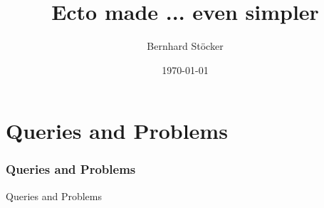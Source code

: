 \documentclass{beamer}
\title[Ecto made even simpler]{Ecto made \cancel{simple}... even simpler} %
\author{Bernhard St\"ocker} %
\institute[UCLA] %
{
Recogizer Group GmbH\\
Predictive Analytics\\ %
\medskip
\textit{bernhard.stoecker@recogizer.de} %
}
\date{\today} %
\begin{document}
{
  \begin{frame}
    \titlepage %
  \end{frame}
}
\addtocounter{framenumber}{-1}



\section{Queries and Problems} %


\begin{frame}
\frametitle{Queries and Problems}
\Huge{\centerline{Queries and Problems}}
\end{frame}

\end{document}
